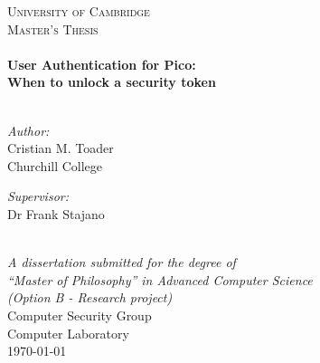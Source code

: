 \documentclass[11pt, a4paper, oneside]{Thesis} %
\begin{document}
\begin{titlepage}
\begin{center}

\textsc{\LARGE University of Cambridge}\\[1.5cm] %
\textsc{\Large Master's Thesis}\\[0.5cm] %

\HRule \\[0.4cm] %
{\huge \bfseries User Authentication for Pico: \\ When to unlock a security token}\\[0.4cm] %
\HRule \\[1.5cm] %
 
\begin{minipage}{0.4\textwidth}
\begin{flushleft} \large
\emph{Author:}\\
{Cristian M. Toader\\ Churchill College} %
\end{flushleft}
\end{minipage}
\begin{minipage}{0.4\textwidth}
\begin{flushright} \large
\emph{Supervisor:} \\
Dr Frank Stajano
\end{flushright}
\end{minipage}\\[3cm]
 
\large \textit{A dissertation submitted for the degree of\\``Master of Philosophy'' in Advanced Computer Science}\\[0.3cm] %
\textit{(Option B - Research project)}\\[0.4cm]
Computer Security Group \\ Computer Laboratory \\[2cm] 
 
{\large \today}\\[4cm] %
 
\vfill
\end{center}

\end{titlepage}

\end{document}
